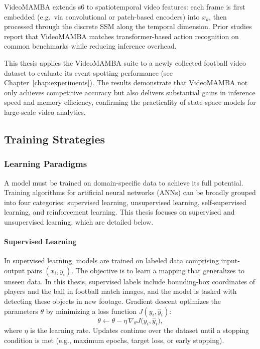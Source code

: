 
VideoMAMBA extends \acrshort{s6} to spatiotemporal video features: each frame is first embedded (e.g.\ via convolutional or patch-based encoders) into \(x_k\), then processed through the discrete SSM along the temporal dimension.  Prior studies \cite{lee_enhancing_mamba_s6_2024, li_videomamba_2024} report that VideoMAMBA matches transformer-based action recognition on common benchmarks while reducing inference overhead.

This thesis applies the VideoMAMBA suite to a newly collected football video dataset to evaluate its event-spotting performance (see Chapter~\ref{chap:experiments}). The results demonstrate that VideoMAMBA not only achieves competitive accuracy but also delivers substantial gains in inference speed and memory efficiency, confirming the practicality of state-space models for large-scale video analytics. 


\subsection{Training Strategies}
\label{ssec:training_stratergies}
\subsubsection{Learning Paradigms}
A model must be trained on domain-specific data to achieve its full potential. Training algorithms for artificial neural networks (ANNs) can be broadly grouped into four categories: supervised learning, unsupervised learning, self-supervised learning, and reinforcement learning. This thesis  focuses on supervised and unsupervised learning, which are detailed below.

\paragraph{Supervised Learning}
In supervised learning, models are trained on labeled data comprising input-output pairs \((x_i, y_i)\). The objective is to learn a mapping that generalizes to unseen data. In this thesis, supervised labels include bounding-box coordinates of players and the ball in football match images, and the model is tasked with detecting these objects in new footage. Gradient descent optimizes the parameters \(\theta\) by minimizing a loss function \(J(y_i, \hat y_i)\):  
\[
\theta \leftarrow \theta - \eta \,\nabla_{\theta}J\bigl(y_i,\hat y_i\bigr),
\]
where \(\eta\) is the learning rate. Updates continue over the dataset until a stopping condition is met (e.g., maximum epochs, target loss, or early stopping).

